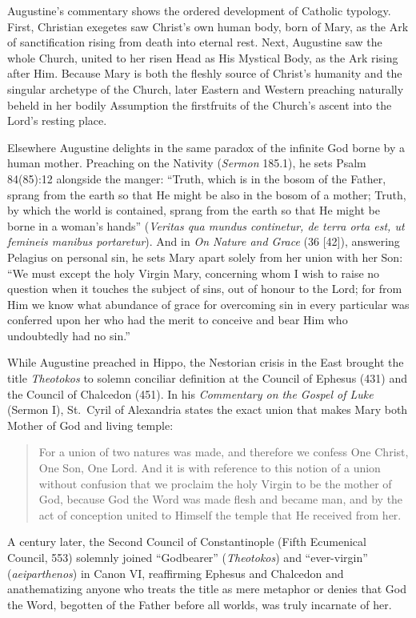 Augustine's commentary shows the ordered development of Catholic typology. First, Christian exegetes saw Christ's own human body, born of Mary, as the Ark of sanctification rising from death into eternal rest. Next, Augustine saw the whole Church, united to her risen Head as His Mystical Body, as the Ark rising after Him. Because Mary is both the fleshly source of Christ's humanity and the singular archetype of the Church, later Eastern and Western preaching naturally beheld in her bodily Assumption the firstfruits of the Church's ascent into the Lord's resting place.

Elsewhere Augustine delights in the same paradox of the infinite God borne by a human mother. Preaching on the Nativity (\textit{Sermon} 185.1), he sets Psalm 84(85):12 alongside the manger: ``Truth, which is in the bosom of the Father, sprang from the earth so that He might be also in the bosom of a mother; Truth, by which the world is contained, sprang from the earth so that He might be borne in a woman's hands'' (\textit{Veritas qua mundus continetur, de terra orta est, ut femineis manibus portaretur}). And in \textit{On Nature and Grace} (36 [42]), answering Pelagius on personal sin, he sets Mary apart solely from her union with her Son: ``We must except the holy Virgin Mary, concerning whom I wish to raise no question when it touches the subject of sins, out of honour to the Lord; for from Him we know what abundance of grace for overcoming sin in every particular was conferred upon her who had the merit to conceive and bear Him who undoubtedly had no sin.''

While Augustine preached in Hippo, the Nestorian crisis in the East brought the title \textit{Theotokos} to solemn conciliar definition at the Council of Ephesus (431) and the Council of Chalcedon (451). In his \textit{Commentary on the Gospel of Luke} (Sermon I), St.\ Cyril of Alexandria states the exact union that makes Mary both Mother of God and living temple:

\begin{quote}\small
For a union of two natures was made, and therefore we confess One Christ, One Son, One Lord. And it is with reference to this notion of a union without confusion that we proclaim the holy Virgin to be the mother of God, because God the Word was made flesh and became man, and by the act of conception united to Himself the temple that He received from her.
\end{quote}

A century later, the Second Council of Constantinople (Fifth Ecumenical Council, 553) solemnly joined ``Godbearer'' (\textit{Theotokos}) and ``ever-virgin'' (\textit{aeiparthenos}) in Canon VI, reaffirming Ephesus and Chalcedon and anathematizing anyone who treats the title as mere metaphor or denies that God the Word, begotten of the Father before all worlds, was truly incarnate of her.


